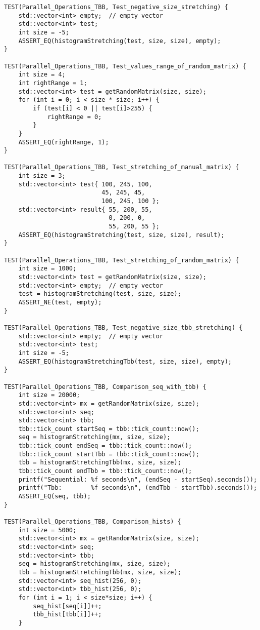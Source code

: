 \documentclass{report}
\begin{document}
\begin{thebibliography}{1}
\begin{lstlisting}
TEST(Parallel_Operations_TBB, Test_negative_size_stretching) {
    std::vector<int> empty;  // empty vector
    std::vector<int> test;
    int size = -5;
    ASSERT_EQ(histogramStretching(test, size, size), empty);
}

TEST(Parallel_Operations_TBB, Test_values_range_of_random_matrix) {
    int size = 4;
    int rightRange = 1;
    std::vector<int> test = getRandomMatrix(size, size);
    for (int i = 0; i < size * size; i++) {
        if (test[i] < 0 || test[i]>255) {
            rightRange = 0;
        }
    }
    ASSERT_EQ(rightRange, 1);
}

TEST(Parallel_Operations_TBB, Test_stretching_of_manual_matrix) {
    int size = 3;
    std::vector<int> test{ 100, 245, 100,
                           45, 245, 45,
                           100, 245, 100 };
    std::vector<int> result{ 55, 200, 55,
                             0, 200, 0,
                             55, 200, 55 };
    ASSERT_EQ(histogramStretching(test, size, size), result);
}

TEST(Parallel_Operations_TBB, Test_stretching_of_random_matrix) {
    int size = 1000;
    std::vector<int> test = getRandomMatrix(size, size);
    std::vector<int> empty;  // empty vector
    test = histogramStretching(test, size, size);
    ASSERT_NE(test, empty);
}

TEST(Parallel_Operations_TBB, Test_negative_size_tbb_stretching) {
    std::vector<int> empty;  // empty vector
    std::vector<int> test;
    int size = -5;
    ASSERT_EQ(histogramStretchingTbb(test, size, size), empty);
}

TEST(Parallel_Operations_TBB, Comparison_seq_with_tbb) {
    int size = 20000;
    std::vector<int> mx = getRandomMatrix(size, size);
    std::vector<int> seq;
    std::vector<int> tbb;
    tbb::tick_count startSeq = tbb::tick_count::now();
    seq = histogramStretching(mx, size, size);
    tbb::tick_count endSeq = tbb::tick_count::now();
    tbb::tick_count startTbb = tbb::tick_count::now();
    tbb = histogramStretchingTbb(mx, size, size);
    tbb::tick_count endTbb = tbb::tick_count::now();
    printf("Sequential: %f seconds\n", (endSeq - startSeq).seconds());
    printf("Tbb:        %f seconds\n", (endTbb - startTbb).seconds());
    ASSERT_EQ(seq, tbb);
}

TEST(Parallel_Operations_TBB, Comparison_hists) {
    int size = 5000;
    std::vector<int> mx = getRandomMatrix(size, size);
    std::vector<int> seq;
    std::vector<int> tbb;
    seq = histogramStretching(mx, size, size);
    tbb = histogramStretchingTbb(mx, size, size);
    std::vector<int> seq_hist(256, 0);
    std::vector<int> tbb_hist(256, 0);
    for (int i = 1; i < size*size; i++) {
        seq_hist[seq[i]]++;
        tbb_hist[tbb[i]]++;
    }


\end{lstlisting}
\end{thebibliography}
\end{document}
